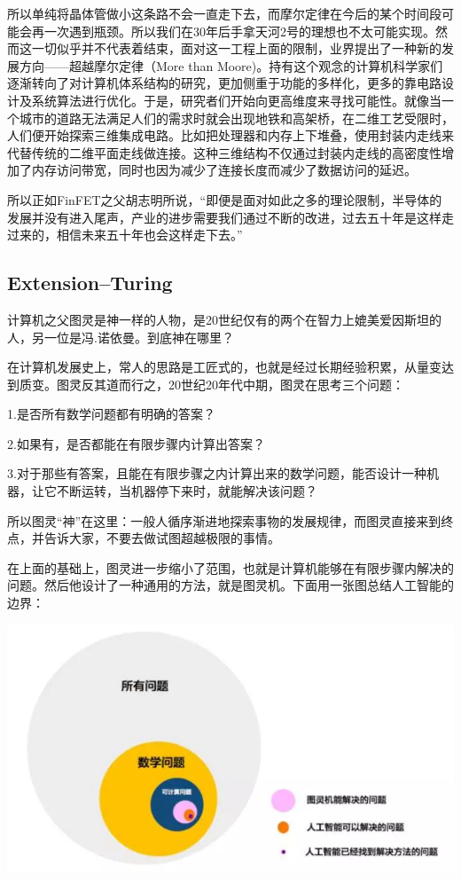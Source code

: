\documentclass{ctexart}
\begin{document}
	所以单纯将晶体管做小这条路不会一直走下去，而摩尔定律在今后的某个时间段可能会再一次遇到瓶颈。所以我们在30年后手拿天河2号的理想也不太可能实现。然而这一切似乎并不代表着结束，面对这一工程上面的限制，业界提出了一种新的发展方向——超越摩尔定律（More than Moore)。持有这个观念的计算机科学家们逐渐转向了对计算机体系结构的研究，更加侧重于功能的多样化，更多的靠电路设计及系统算法进行优化。于是，研究者们开始向更高维度来寻找可能性。就像当一个城市的道路无法满足人们的需求时就会出现地铁和高架桥，在二维工艺受限时，人们便开始探索三维集成电路。比如把处理器和内存上下堆叠，使用封装内走线来代替传统的二维平面走线做连接。这种三维结构不仅通过封装内走线的高密度性增加了内存访问带宽，同时也因为减少了连接长度而减少了数据访问的延迟。
	
	所以正如FinFET之父胡志明所说，“即便是面对如此之多的理论限制，半导体的发展并没有进入尾声，产业的进步需要我们通过不断的改进，过去五十年是这样走过来的，相信未来五十年也会这样走下去。”
	\subsection{Extension--Turing}
	计算机之父图灵是神一样的人物，是20世纪仅有的两个在智力上媲美爱因斯坦的人，另一位是冯.诺依曼。到底神在哪里？
	
	在计算机发展史上，常人的思路是工匠式的，也就是经过长期经验积累，从量变达到质变。图灵反其道而行之，20世纪20年代中期，图灵在思考三个问题：
	
	1.是否所有数学问题都有明确的答案？
	
	2.如果有，是否都能在有限步骤内计算出答案？
	
	3.对于那些有答案，且能在有限步骤之内计算出来的数学问题，能否设计一种机器，让它不断运转，当机器停下来时，就能解决该问题？
	
	所以图灵“神”在这里：一般人循序渐进地探索事物的发展规律，而图灵直接来到终点，并告诉大家，不要去做试图超越极限的事情。
	
	在上面的基础上，图灵进一步缩小了范围，也就是计算机能够在有限步骤内解决的问题。然后他设计了一种通用的方法，就是图灵机。下面用一张图总结人工智能的边界：
	
	\includegraphics[scale=0.5]{1}
	
\end{document}
